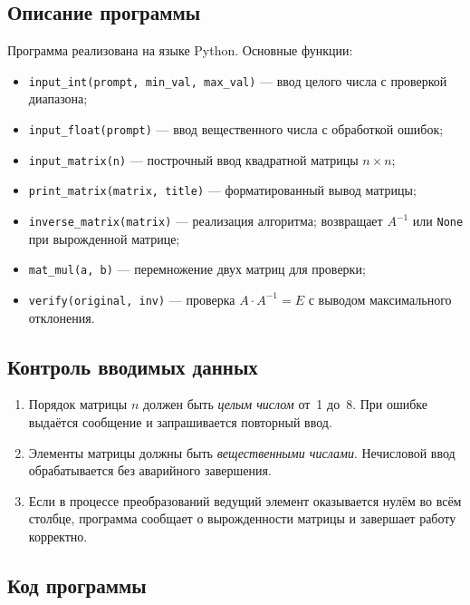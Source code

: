 \documentclass[12pt,a4paper]{scrartcl}
\begin{document}
\subsection{Описание программы}

Программа реализована на языке Python. Основные функции:
\begin{itemize}
    \item \texttt{input\_int(prompt, min\_val, max\_val)} ---
          ввод целого числа с проверкой диапазона;
    \item \texttt{input\_float(prompt)} ---
          ввод вещественного числа с обработкой ошибок;
    \item \texttt{input\_matrix(n)} ---
          построчный ввод квадратной матрицы $n \times n$;
    \item \texttt{print\_matrix(matrix, title)} ---
          форматированный вывод матрицы;
    \item \texttt{inverse\_matrix(matrix)} ---
          реализация алгоритма; возвращает $A^{-1}$ или
          \texttt{None} при вырожденной матрице;
    \item \texttt{mat\_mul(a, b)} ---
          перемножение двух матриц для проверки;
    \item \texttt{verify(original, inv)} ---
          проверка $A \cdot A^{-1} = E$ с выводом максимального отклонения.
\end{itemize}

\subsection{Контроль вводимых данных}

\begin{enumerate}
    \item Порядок матрицы $n$ должен быть \emph{целым числом} от~1 до~8.
          При ошибке выдаётся сообщение и запрашивается повторный ввод.
    \item Элементы матрицы должны быть \emph{вещественными числами}.
          Нечисловой ввод обрабатывается без аварийного завершения.
    \item Если в процессе преобразований ведущий элемент оказывается нулём
          во всём столбце, программа сообщает о вырожденности матрицы
          и завершает работу корректно.
\end{enumerate}

\subsection{Код программы}
\label{sec:code}
\end{document}
